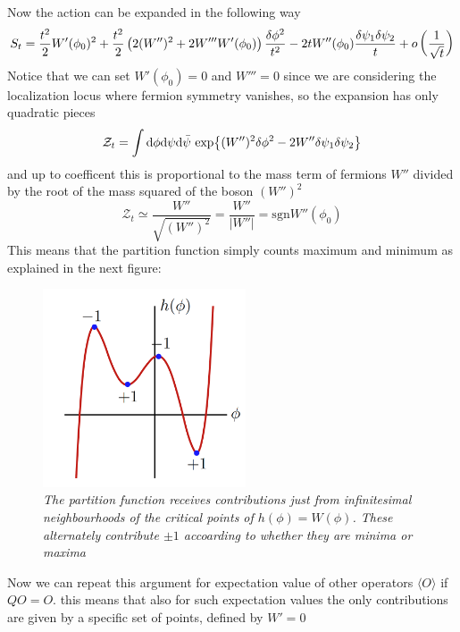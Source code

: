\documentclass[../main/main.tex]{subfiles}
\begin{document}
Now the action can be expanded in the following way
\[S_t=\frac{t^2}2W'(\phi_0)^2+\frac{t^2}2\left(2(W'')^2+2W'''W'(\phi_0)\right)\frac{\delta\phi^2}{t^2}-2tW''(\phi_0)\frac{\delta\psi_1\delta\psi_2}t+o\left(\frac1{\sqrt t}\right)\]
Notice that we can set $W'(\phi_0)=0$ and $W'''=0$ since we are considering the localization locus where fermion symmetry vanishes, so the expansion has only quadratic pieces
\[\mathcal Z_t=\int\textup{d}\phi\textup{d}\psi\textup{d}\bar\psi\,\exp{(W'')^2\delta\phi^2-2W''\delta\psi_1\delta\psi_2}\]
and up to coefficent this is proportional to the mass term of fermions $W''$ divided by the root of the mass squared of the boson $(W'')^2$
\[\mathcal Z_t\simeq\frac{W''}{\sqrt{(W'')^2}}=\frac{W''}{|W''|}=\text{sgn} W''(\phi_0)\]
This means that the partition function simply counts maximum and minimum as explained in the next figure:
\begin{figure}[H]
\centering
\includegraphics[width=6cm]{../img/Localization.png}
\caption{\textit {The partition function receives contributions just from infinitesimal neighbourhoods of the critical points of $h(\phi)=W(\phi)$. These alternately contribute $\pm1$ accoarding to whether they are minima or maxima}}
\end{figure}

Now we can repeat this argument for expectation value of other operators $\langle O\rangle$ if $QO=O$. this means that also for such expectation values the only contributions are given by a specific set of points, defined by $W'=0$
\end{document}
